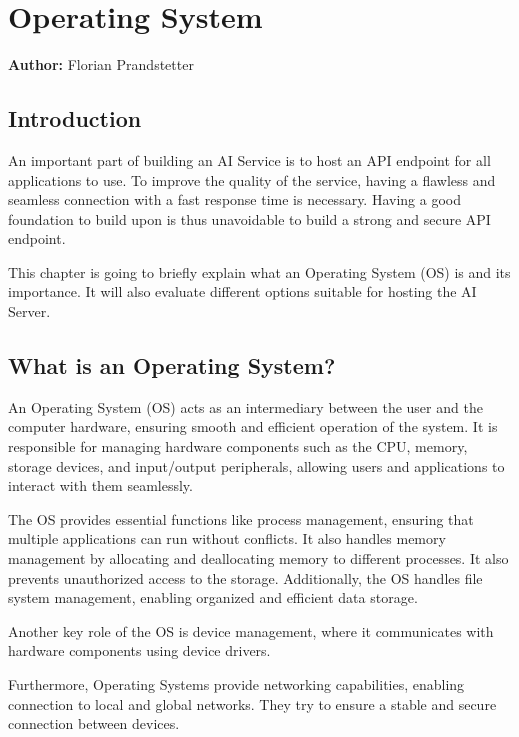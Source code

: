 \chapter{Operating System }
\label{chap:Operating_Systems_used}
\textbf{Author:} Florian Prandstetter

\section {Introduction}

An important part of building an AI Service is to host an API endpoint for all applications to use. To improve the quality of the service, having a flawless and seamless connection with a fast response time is necessary.
Having a good foundation to build upon is thus unavoidable to build a strong and secure API endpoint. 

This chapter is going to briefly explain what an Operating System (OS) is and its importance.
It will also evaluate different options suitable for hosting the AI Server.

\section{What is an Operating System?}
\label{sec:WhatIsAnOs}

An Operating System (OS) acts as an intermediary between the user and the computer hardware, ensuring smooth and efficient operation of the system. It is responsible for managing hardware components such as the CPU, memory, storage devices, and input/output peripherals, allowing users and applications to interact with them seamlessly.

The OS provides essential functions like process management, ensuring that multiple applications can run without conflicts. It also handles memory management by allocating and deallocating memory to different processes. It also prevents unauthorized access to the storage.
Additionally, the OS handles file system management, enabling organized and efficient data storage. 

Another key role of the OS is device management, where it communicates with hardware components using device drivers.

Furthermore, Operating Systems provide networking capabilities, enabling connection to local and global networks. They try to ensure a stable and secure connection between devices.

